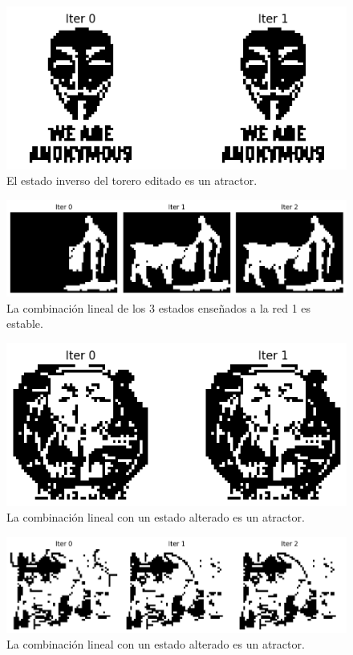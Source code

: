 \documentclass[11pt]{article} %
\begin{document}
\begin{figure}[h!]
    \centering
    \includegraphics[width=0.8\linewidth]{imgs/ej1_3_2.png}
    \caption{El estado inverso del torero editado es un atractor.}
    \label{fig:ej1_3_2}
\end{figure}

\begin{figure}[h!]
    \centering
    \includegraphics[width=1\linewidth]{imgs/ej1_3_3.png}
    \caption{La combinación lineal de los 3 estados enseñados a la red 1 es estable.}
    \label{fig:ej1_3_3}
\end{figure}

\begin{figure}[h!]
    \centering
    \includegraphics[width=0.8\linewidth]{imgs/ej1_3_4.png}
    \caption{La combinación lineal con un estado alterado es un atractor.}
    \label{fig:ej1_3_4}
\end{figure}

\begin{figure}[h!]
    \centering
    \includegraphics[width=1\linewidth]{imgs/ej1_3_5.png}
    \caption{La combinación lineal con un estado alterado es un atractor.}
    \label{fig:ej1_3_5}
\end{figure}
\clearpage
\newpage
\end{document}
